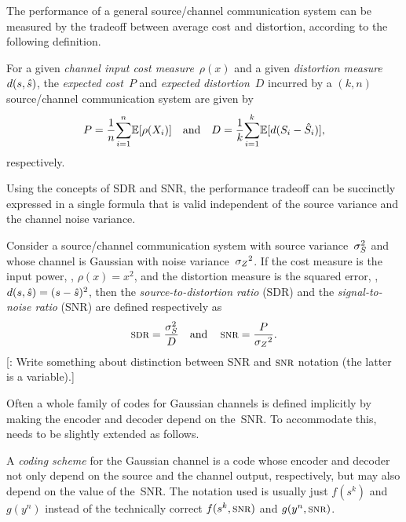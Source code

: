 The performance of a general source/channel communication system can be measured
by the tradeoff between average cost and distortion, according to the following
definition.
\begin{definition}
  \label{def:PDgen}
  For a given \emph{channel input cost measure}~$\rho(x)$ and a given
  \emph{distortion measure}~$d(s,{\hat{s}})$, the \emph{expected cost}~$P$ and
  \emph{expected distortion}~$D$ incurred by a $(k,n)$ source/channel
  communication system are given by
  \begin{equation*}
    P = \frac1n {\sum_{i=1}^n} \mathbb{E}[\rho(X_i)] \quad \text{and} \quad
    D = \frac1k {\sum_{i=1}^k} \mathbb{E}[d(S_i - {\hat{S}}_i)],
  \end{equation*}
  respectively.
\end{definition}

Using the concepts of SDR and SNR, the performance tradeoff can be
succinctly expressed in a single formula that is valid independent of the source
variance and the channel noise variance. 
\begin{definition}
  \label{def:sdrsnr}
  Consider a source/channel communication system with source
  variance~${\sigma_S^2}$ and whose channel is Gaussian with noise variance~${{\sigma_Z}^2}$. If
  the cost measure is the input power, \ie, $\rho(x) = x^2$, and the distortion
  measure is the squared error, \ie, $d(s,{\hat{s}}) = (s - {\hat{s}})^2$, then the
  \emph{source-to-distortion ratio} (SDR) and the \emph{signal-to-noise ratio}
  (SNR) are defined respectively as
  \begin{equation*}
    \sdr = \frac{\ssq}{D} \quad \text{and} \quad
    \snr = \frac{P}{\szq}.
  \end{equation*}
  [\todo: Write something about distinction between SNR and $\snr$ notation (the
  latter is a variable).]
\end{definition}

Often a whole family of codes for Gaussian channels is defined implicitly by
making the encoder and decoder depend on the~SNR. To accommodate this,
 needs to be slightly extended as follows.
\begin{definition}
  \label{def:codingscheme}
  A \emph{coding scheme} for the Gaussian channel is a code whose encoder and
  decoder not only depend on the source and the channel output, respectively,
  but may also depend on the value of the~SNR. The notation used is usually just
  $f(s^k)$ and $g(y^n)$ instead of the technically correct $f(s^k,\snr)$ and
  $g(y^n,\snr)$.
\end{definition}


